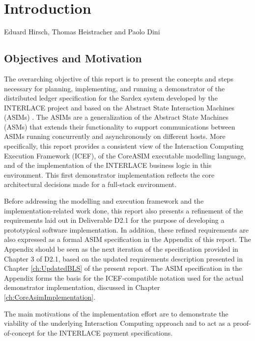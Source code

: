 \chapter{Introduction}
\label{ch:Introduction}

\vspace{-1cm}
\begin{center}
Eduard Hirsch, Thomas Heistracher and Paolo Dini
\end{center}


\section{Objectives and Motivation}
The overarching objective of this report is to present the concepts and steps necessary for planning, implementing, and running a demonstrator of the distributed ledger specification  for the Sardex system developed by the INTERLACE project and based on the Abstract State Interaction Machines (ASIMs) \cite{BIOMICSD42,BIOMICSD52}. The ASIMs are a generalization of the Abstract State Machines (ASMs) \cite{BoergerStaerk2003,BoergerRaschke2018} that extends their functionality to support communications between ASIMs running concurrently and asynchronously on different hosts. More specifically, this report provides a consistent view of the Interaction Computing Execution Framework (ICEF), of the CoreASIM executable modelling language, and of the implementation of the INTERLACE business logic in this environment. This first demonstrator implementation reflects the core architectural decisions made for a full-stack environment.

Before addressing the modelling and execution framework and the implementation-related work done, this report also presents a refinement of the requirements laid out in Deliverable D2.1 \cite{INTERLACE_D21} for the purpose of developing a prototypical software implementation. In addition, these refined requirements are also expressed as a formal ASIM specification in the Appendix of this report. The Appendix should be seen as the next iteration of the specification provided in Chapter 3 of D2.1, based on the updated requirements description presented in Chapter \ref{ch:UpdatedBLS} of the present report. The ASIM specification in the Appendix forms the basis for the ICEF-compatible notation used for the actual demonstrator implementation, discussed in Chapter \ref{ch:CoreAsimImplementation}.

The main motivations of the implementation effort are to demonstrate the viability of the underlying Interaction Computing approach and to act as a proof-of-concept for the INTERLACE payment specifications.

